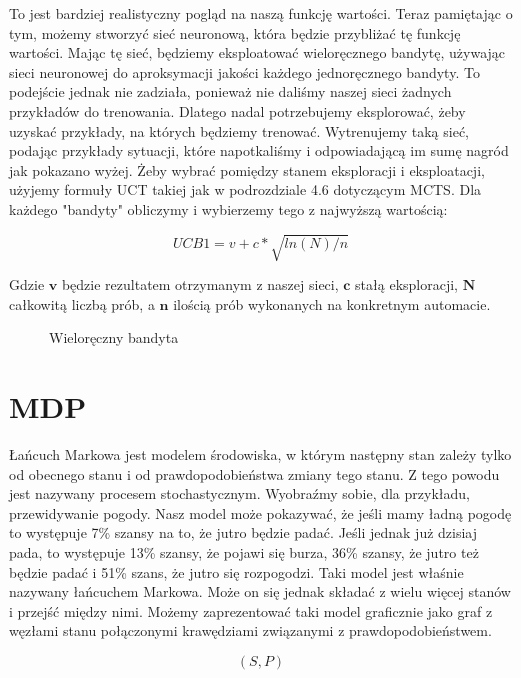 To jest bardziej realistyczny pogląd na naszą funkcję wartości. Teraz pamiętając o tym, możemy stworzyć sieć neuronową, która będzie przybliżać tę funkcję wartości. Mając tę sieć, będziemy eksploatować wieloręcznego bandytę, używając sieci neuronowej do aproksymacji jakości każdego jednoręcznego bandyty. To podejście jednak nie zadziała, ponieważ nie daliśmy naszej sieci żadnych przykładów do trenowania. Dlatego nadal potrzebujemy eksplorować, żeby uzyskać przykłady, na których będziemy trenować. Wytrenujemy taką sieć, podając przykłady sytuacji, które napotkaliśmy i odpowiadającą im sumę nagród jak pokazano wyżej. Żeby wybrać pomiędzy stanem eksploracji i eksploatacji, użyjemy formuły UCT takiej jak w podrozdziale 4.6 dotyczącym MCTS. Dla każdego "bandyty" obliczymy i wybierzemy tego z najwyższą wartością:

\begin{equation}
UCB1 = v + c * \sqrt{ln(N) / n}
\end{equation}

\noindent Gdzie $\boldsymbol{v}$ będzie rezultatem otrzymanym z naszej sieci, $\boldsymbol{c}$ stałą eksploracji, $\boldsymbol{N}$ całkowitą liczbą prób, a $\boldsymbol{n}$ ilością prób wykonanych na konkretnym automacie.

\clearpage
\begin{figure}[H]
\centering

\caption{Wieloręczny bandyta}
\end{figure}
\clearpage

\section{MDP}

Łańcuch Markowa jest modelem środowiska, w którym następny stan zależy tylko od obecnego stanu i od prawdopodobieństwa zmiany tego stanu. Z tego powodu jest nazywany procesem stochastycznym. Wyobraźmy sobie, dla przykładu, przewidywanie pogody. Nasz model może pokazywać, że jeśli mamy ładną pogodę to występuje 7\% szansy na to, że jutro będzie padać. Jeśli jednak już dzisiaj pada, to występuje 13\% szansy, że pojawi się burza, 36\% szansy, że jutro też będzie padać i 51\% szans, że jutro się rozpogodzi. Taki model jest właśnie nazywany łańcuchem Markowa. Może on się jednak składać z wielu więcej stanów i przejść między nimi. Możemy zaprezentować taki model graficznie jako graf z węzłami stanu połączonymi krawędziami związanymi z prawdopodobieństwem.

\begin{equation}
(S, P)
\end{equation}

